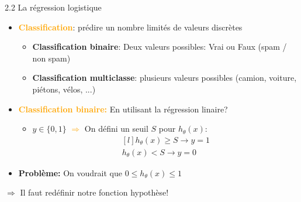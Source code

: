 \begin{frame}{2.2 La régression logistique}
  \begin{itemize}
  \item \textbf{\textcolor{orange}{Classification}}: prédire un nombre limités de valeurs discrètes
    \begin{itemize}
    \item \textbf{Classification binaire}: Deux valeurs possibles: Vrai ou Faux (spam / non spam)
    \item \textbf{Classification multiclasse}: plusieurs valeurs possibles (camion, voiture, piétons, vélos, ...)
    \end{itemize}
    \vspace{0.5cm}
  \item \textcolor{orange}{\textbf{Classification binaire:}} En utilisant la régression linaire?
    \begin{itemize}
    \item $y \in \{0,1\}$ \textcolor{orange}{$\Rightarrow$} On défini un seuil $S$ pour $h_{\theta}(x)$:
      \begin{equation*}
        \begin{matrix*}[l]
          h_{\theta}(x) \geq S \rightarrow y = 1\\
          h_{\theta}(x) < S \rightarrow y = 0
        \end{matrix*}
      \end{equation*}
    \end{itemize}
  \item \textbf{Problème:} On voudrait que $0 \leq h_{\theta}(x) \leq 1$
  \end{itemize}
  \begin{center}
    $\Rightarrow$ Il faut redéfinir notre fonction hypothèse!
  \end{center}
\end{frame}

